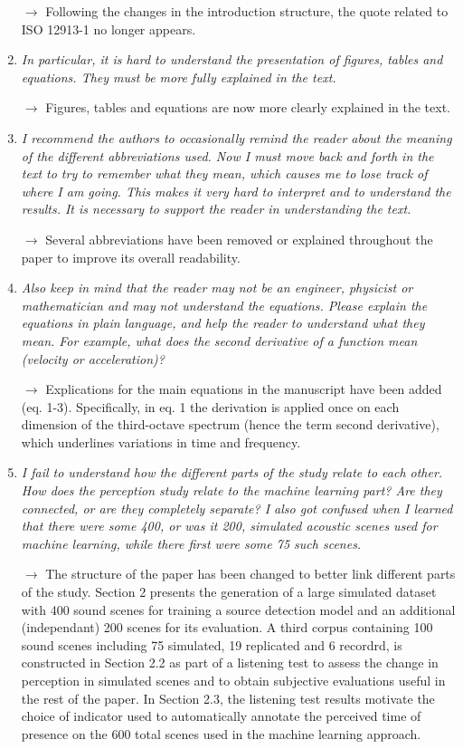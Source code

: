 \documentclass[10pt]{article}
\begin{document}
\begin{enumerate}
$\rightarrow$ Following the changes in the introduction structure, the quote related to ISO 12913-1 no longer appears.

\item \emph{In particular, it is hard to understand the presentation of figures, tables and equations. They must be more fully explained in the text.}

$\rightarrow$ Figures, tables and equations are now more clearly explained in the text. 

\item \emph{I recommend the authors to occasionally remind the reader about the meaning of the different abbreviations used. Now I must move back and forth in the text to try to remember what they mean, which causes me to lose track of where I am going. This makes it very hard to interpret and to understand the results. It is necessary to support the reader in understanding the text.}

$\rightarrow$ Several abbreviations have been removed or explained throughout the paper to improve its overall readability.

\item \emph{Also keep in mind that the reader may not be an engineer, physicist or mathematician and may not understand the equations. Please explain the equations in plain language, and help the reader to understand what they mean. For example, what does the second derivative of a function mean (velocity or acceleration)?}

$\rightarrow$ Explications for the main equations in the manuscript have been added (eq. 1-3). Specifically, in eq. 1 the derivation is applied once on each dimension of the third-octave spectrum (hence the term second derivative), which underlines variations in time and frequency.

\item \emph{I fail to understand how the different parts of the study relate to each other. How does the perception study relate to the machine learning part? Are they connected, or are they completely separate? I also got confused when I learned that there were some 400, or was it 200, simulated acoustic scenes used for machine learning, while there first were some 75 such scenes.}

$\rightarrow$ The structure of the paper has been changed to better link different parts of the study. Section 2 presents the generation of a large simulated dataset with 400 sound scenes for training a source detection model and an additional (independant) 200 scenes for its evaluation. A third corpus containing 100 sound scenes including 75 simulated, 19 replicated and 6 recordrd, is constructed in Section 2.2 as part of a listening test to assess the change in perception in simulated scenes and to obtain subjective evaluations useful in the rest of the paper. In Section 2.3, the listening test results motivate the choice of indicator used to automatically annotate the perceived time of presence on the 600 total scenes used in the machine learning approach.


\end{enumerate}
\end{document}
